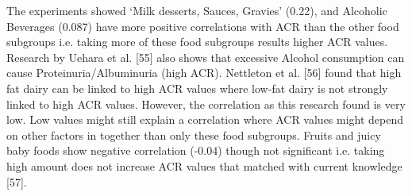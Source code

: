 \noindent The experiments showed  `Milk desserts, Sauces, Gravies' (0.22), and Alcoholic Beverages (0.087) have more positive correlations with ACR than the other food subgroups  i.e. taking more of these food subgroups results higher ACR values. Research by Uehara et al. [55] also shows that excessive Alcohol consumption can cause Proteinuria/Albuminuria (high ACR). Nettleton et al. [56] found that high fat dairy can be linked to high ACR values where low-fat dairy is not strongly linked to high ACR values. However, the correlation as this research found is very low. Low values might still explain a correlation where ACR values might depend on other factors in together than only these food subgroups. Fruits and juicy baby foods show negative correlation (-0.04) though not significant i.e. taking high amount does not increase ACR values that matched with current knowledge [57].